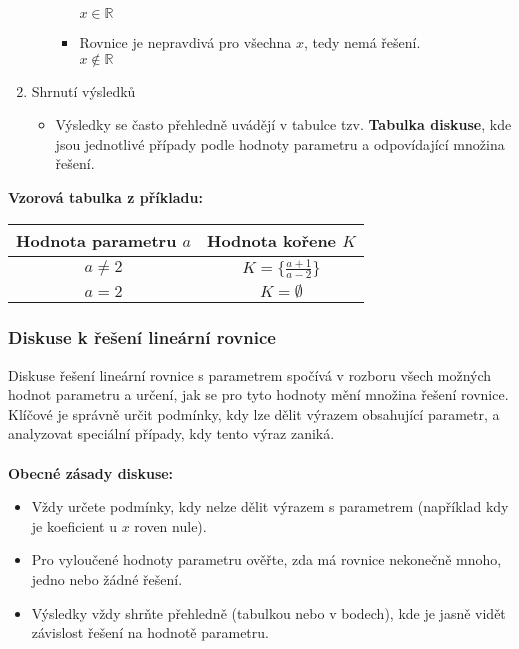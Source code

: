 \begin{enumerate}
\begin{enumerate}
\begin{itemize}
                                $x\in \mathbb{R}$
                                \item Rovnice je nepravdivá pro všechna $x$, tedy nemá řešení.\\
                                $x\not\in \mathbb{R}$
                            \end{itemize}
                \end{enumerate}
    \item Shrnutí výsledků
        \begin{itemize}
            \item Výsledky se často přehledně uvádějí v tabulce tzv. \textbf{Tabulka diskuse}, kde jsou jednotlivé případy podle hodnoty parametru a odpovídající množina řešení.
        \end{itemize}
\end{enumerate}
   
        \textbf{Vzorová tabulka z příkladu:}
        
            \begin{center}
            \begin{tabular}{||c| c||} 
             \hline
             \textbf{Hodnota parametru $a$} & \textbf{Hodnota kořene $K$} \\ [0.5ex] 
             \hline\hline
             $a\not=2$ & $K=\{\frac{a+1}{a-2}\}$ \\
             \hline
             $a=2$ & $K=\emptyset$ \\
             \hline
            \end{tabular}
            \end{center}
  
        \subsubsection{Diskuse k řešení lineární rovnice}
Diskuse řešení lineární rovnice s parametrem spočívá v rozboru všech možných hodnot parametru a určení, jak se pro tyto hodnoty mění množina řešení rovnice. Klíčové je správně určit podmínky, kdy lze dělit výrazem obsahující parametr, a analyzovat speciální případy, kdy tento výraz zaniká.\\\\
\textbf{Obecné zásady diskuse:}
 \begin{itemize}
     \item Vždy určete podmínky, kdy nelze dělit výrazem s parametrem (například kdy je koeficient u $x$ roven nule).
     \item Pro vyloučené hodnoty parametru ověřte, zda má rovnice nekonečně mnoho, jedno nebo žádné řešení.
     \item  Výsledky vždy shrňte přehledně (tabulkou nebo v bodech), kde je jasně vidět závislost řešení na hodnotě parametru.
 \end{itemize}
